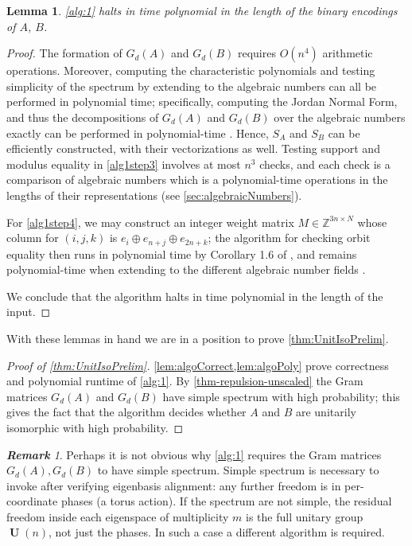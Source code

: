 \documentclass[11pt]{article}
\numberwithin{equation}{section}
\newtheorem{lemma}[theorem]{Lemma}
\theoremstyle{remark}
\newtheorem{remark}{\bf Remark}[section]
\DeclareMathOperator{\Unitary}{\textbf{U}}
\begin{document}
\begin{lemma}\label{lem:algoPoly}
    \cref{alg:1} halts in time polynomial in the length of the binary encodings of $A$, $B$.
\end{lemma}
\begin{proof}
The formation of $G_d(A)$ and $G_d(B)$ requires $O(n^4)$ arithmetic operations. Moreover, computing the characteristic polynomials and testing simplicity of the spectrum by extending to the algebraic numbers can all be performed in polynomial time; specifically, computing the Jordan Normal Form, and thus the decompositions of $G_d(A)$ and $G_d(B)$ over the algebraic numbers exactly can be performed in polynomial-time  \cite{cai1994computing}. Hence, $S_A$ and $S_B$ can be efficiently constructed, with their vectorizations as well. Testing support and modulus equality in \ref{alg1step3} involves at most $n^3$ checks, and each check is a comparison of algebraic numbers which is a polynomial-time operations in the lengths of their representations (see \cref{sec:algebraicNumbers}).

For \ref{alg1step4}, we may construct an integer weight matrix $M\in\mathbb{Z}^{3n\times N}$ whose column for $(i,j,k)$ is $e_i\oplus e_{n+j}\oplus e_{2n+k}$; the algorithm for checking orbit equality then runs in polynomial time by Corollary 1.6 of \cite{burgisser_et_alCCC.2021.32}, and remains polynomial-time when extending to the different algebraic number fields \cite{burgisser_et_alCCC.2021.32,ge1993testing}.

We conclude that the algorithm halts in time polynomial in the length of the input.
\end{proof}

With these lemmas in hand we are in a position to prove \cref{thm:UnitIsoPrelim}.

\begin{proof}[Proof of \cref{thm:UnitIsoPrelim}]
    \cref{lem:algoCorrect,lem:algoPoly} prove correctness and polynomial runtime of \cref{alg:1}. By \cref{thm-repulsion-unscaled} the Gram matrices $G_d(A)$ and $G_d(B)$ have simple spectrum with high probability; this gives the fact that the algorithm decides whether $A$ and $B$ are unitarily isomorphic with high probability.
\end{proof}

\begin{remark}
Perhaps it is not obvious why \cref{alg:1} requires the Gram matrices $G_d(A), G_d(B)$ to have simple spectrum. Simple spectrum is necessary to invoke \cite{burgisser_et_alCCC.2021.32} after verifying eigenbasis alignment: any further freedom is in per-coordinate phases (a torus action). If the spectrum are not simple, the residual freedom inside each eigenspace of multiplicity $m$ is the full unitary group $\Unitary(n)$, not just the phases. In such a case a different algorithm is required.
\end{remark}
\end{document}
